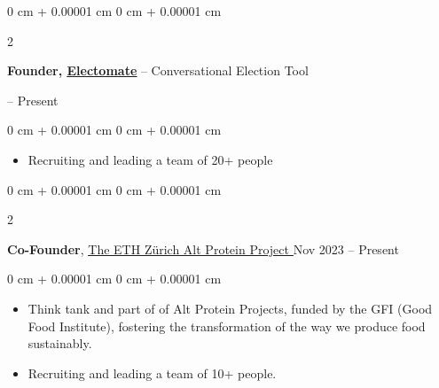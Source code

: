 \documentclass[10pt, letterpaper]{article}
\newenvironment{highlights}{
    \begin{itemize}[
        topsep=0.10 cm,
        parsep=0.10 cm,
        partopsep=0pt,
        itemsep=0pt,
        leftmargin=0 cm + 10pt
    ]
}{
    \end{itemize}
} %
\newenvironment{onecolentry}{
    \begin{adjustwidth}{
        0 cm + 0.00001 cm
    }{
        0 cm + 0.00001 cm
    }
}{
    \end{adjustwidth}
} %
\newenvironment{twocolentry}[2][]{
    \onecolentry
    \def\secondColumn{#2}
    \setcolumnwidth{\fill, 4.5 cm}
    \begin{paracol}{2}
}{
    \switchcolumn \raggedleft \secondColumn
    \end{paracol}
    \endonecolentry
} %
\begin{document}
        \vspace{0.2 cm}

        \begin{twocolentry}
        {        2024 – Present}
            \textbf{Founder, \href{https://elect-o-mate.eu/}{\underline{Electomate}}} – Conversational Election Tool
        \end{twocolentry}
        

        \vspace{0.10 cm}
        \begin{onecolentry}
            \begin{highlights}
                \item Recruiting and leading a team of 20+ people
            \end{highlights}
        \end{onecolentry}







      
        \begin{twocolentry}{
            Nov 2023 – Present
        }
    
            \textbf{Co-Founder}, \href{https://ethzurichaltpro.wordpress.com/}{\underline{The ETH Zürich Alt Protein Project }}\end{twocolentry}


        \vspace{0.10 cm}
        \begin{onecolentry}
            \begin{highlights}
                \item Think tank and part of of Alt Protein Projects, funded by the GFI (Good Food Institute), fostering the transformation of the way we produce food sustainably.
                \item Recruiting and leading a team of 10+ people.
            \end{highlights}
        \end{onecolentry}
\end{document}
